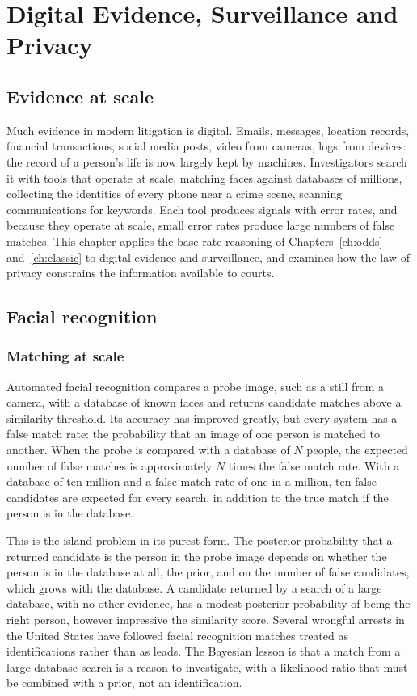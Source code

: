 \chapter{Digital Evidence, Surveillance and Privacy}
\label{ch:digital}

\section{Evidence at scale}

Much evidence in modern litigation is digital. Emails, messages, location records, financial transactions, social media posts, video from cameras, logs from devices: the record of a person's life is now largely kept by machines. Investigators search it with tools that operate at scale, matching faces against databases of millions, collecting the identities of every phone near a crime scene, scanning communications for keywords. Each tool produces signals with error rates, and because they operate at scale, small error rates produce large numbers of false matches. This chapter applies the base rate reasoning of Chapters~\ref{ch:odds} and~\ref{ch:classic} to digital evidence and surveillance, and examines how the law of privacy constrains the information available to courts.

\section{Facial recognition}

\subsection{Matching at scale}

Automated facial recognition compares a probe image, such as a still from a camera, with a database of known faces and returns candidate matches above a similarity threshold. Its accuracy has improved greatly, but every system has a false match rate: the probability that an image of one person is matched to another. When the probe is compared with a database of $N$ people, the expected number of false matches is approximately $N$ times the false match rate. With a database of ten million and a false match rate of one in a million, ten false candidates are expected for every search, in addition to the true match if the person is in the database.

This is the island problem in its purest form. The posterior probability that a returned candidate is the person in the probe image depends on whether the person is in the database at all, the prior, and on the number of false candidates, which grows with the database. A candidate returned by a search of a large database, with no other evidence, has a modest posterior probability of being the right person, however impressive the similarity score. Several wrongful arrests in the United States have followed facial recognition matches treated as identifications rather than as leads. The Bayesian lesson is that a match from a large database search is a reason to investigate, with a likelihood ratio that must be combined with a prior, not an identification.

